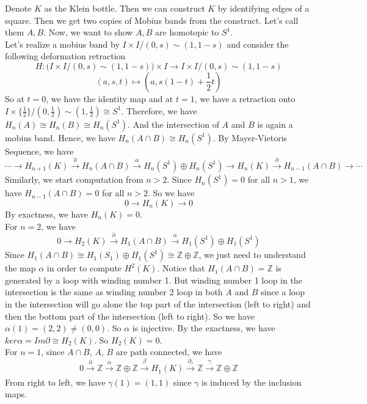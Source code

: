 \documentclass[12pt]{amsart}
\newcommand{\Z}{\mathbb{Z}}
\begin{document}
\hfill\\
\hfill\\
\hfill\\
\hfill\\
\hfill\\Denote $K$ as the Klein bottle. Then we can construct $K$ by identifying edges of a square. Then we get two copies of Mobius bands from the construct. Let's call them $A,B$. Now, we want to show $A,B$ are homotopic to $S^1$.\\
Let's realize a mobius band by $I\times I/(0,s)\sim(1,1-s)$ and consider the following deformation retraction
\[H:\big(I\times I/(0,s)\sim(1,1-s)\big)\times I\to I\times I/(0,s)\sim(1,1-s)\]
\[(a,s,t)\mapsto (a,s(1-t)+\frac{1}{2}t)\]
So at $t=0$, we have the identity map and at $t=1$, we have a retraction onto $I\times \{\frac{1}{2}\}/(0,\frac{1}{2})\sim(1,\frac{1}{2})\cong S^1$. Therefore, we have $H_n(A)\cong H_n(B)\cong H_n(S^1)$. And the intersection of $A$ and $B$ is again a mobius band. Hence, we have  $H_n(A\cap B)\cong H_n(S^1)$. By Mayer-Vietoris Sequence, we have 
\[\cdots \xrightarrow[]{}H_{n+1}(K) \xrightarrow[]{\partial}H_n(A\cap B)\xrightarrow[]{\alpha}H_n(S^1)\oplus H_n(S^1)\xrightarrow[]{}H_n(K)\xrightarrow[]{\partial}H_{n-1}(A\cap B)\to \cdots\]
Similarly, we start computation from $n>2$. Since $H_n(S^1)=0$ for all $n>1$, we have $H_{n-1}(A\cap B)=0$ for all $n>2$. So we have
\[0\to H_n(K)\to 0\]
By exactness, we have $H_n(K)=0$.\\
For $n=2$, we have 
\[0\to H_2(K)\xrightarrow[]{\partial} H_1(A\cap B)\xrightarrow[]{\alpha}H_1(S^1)\oplus H_1(S^1)\]
Since $H_1(A\cap B)\cong H_1(S_1)\oplus H_1(S^1)\cong \Z\oplus\Z$, we just need to understand the map $\alpha$ in order to compute $H^2(K)$. Notice that $H_1(A\cap B)=\Z$ is generated by a loop with winding number 1. But winding number 1 loop in the intersection is the same as winding number 2 loop in both $A$ and $B$ since a loop in the intersection will go alone the top part of the intersection (left to right) and then the bottom part of the intersection (left to right). So we have $\alpha(1)=(2,2)\neq (0,0)$. So $\alpha$ is injective. By the exactness, we have $ker\alpha=Im\partial\cong H_2(K)$. So $H_2(K)=0$. \\
For $n=1$, since $A\cap B$, $A$, $B$ are path connected, we have 
\[0\xrightarrow[]{\partial} \Z\xrightarrow[]{\alpha}\Z\oplus \Z\xrightarrow[]{\beta}H_1(K)\xrightarrow[]{\partial_1}\Z\xrightarrow[]{\gamma}\Z\oplus\Z\]
From right to left, we have $\gamma(1)=(1,1)$ since $\gamma$ is induced by the inclusion maps.
\end{document}
